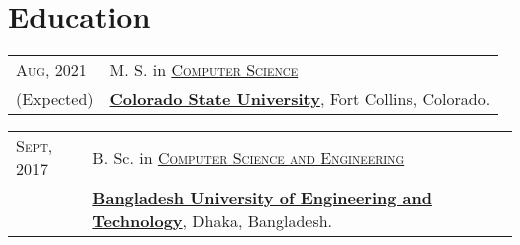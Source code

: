 \documentclass[letterpaper,10pt]{article}
\begin{document}
\section{Education}
\begin{tabular}{p{1.8cm}|l} 

  \textsc{Aug}, 2021 & M. S. in \href{https://compsci.colostate.edu}{\textsc{Computer Science}} \\
 (Expected) & \href{https://www.colostate.edu/}{\textbf{Colorado State University}}, Fort Collins, Colorado.

\end{tabular}

\begin{tabular}{p{1.8cm}|l}
 \textsc{Sept}, 2017 & B. Sc. in \href{https://cse.buet.ac.bd/}{\textsc{Computer Science and Engineering}} \\ %
 & \href{http://www.buet.ac.bd/}{\textbf{Bangladesh University of Engineering and Technology}}, Dhaka, Bangladesh.

\end{tabular}
\end{document}
